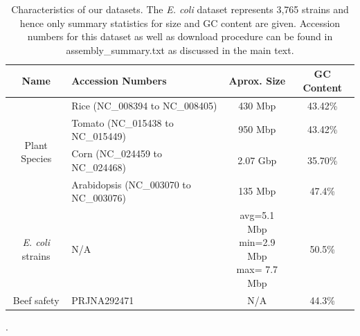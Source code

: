 \documentclass[doctor]{thesis}
\begin{document}
    \begin{table}
      \small
   \centering
   \begin{tabular}{|c|l|c|c|}
     \hline
     {\bf Name} &  {\bf Accession Numbers} & {\bf Aprox. Size} & {\bf GC Content} \\

     \hline
               	 	 	 	 	                
     \multirow{4}{*}{Plant Species }
     & Rice  (NC\_008394 to NC\_008405) & 430 Mbp & 43.42\% \\
     & Tomato  (NC\_015438 to NC\_015449) &  950 Mbp & 43.42\% \\
     & Corn  (NC\_024459 to NC\_024468) & 2.07 Gbp & 35.70\% \\
     & Arabidopsis  (NC\_003070 to NC\_003076) & 135 Mbp & 47.4\% \\
     \hline

     \emph{E. coli} strains &  N/A & \pbox{3cm}{avg=5.1 Mbp\\ min=2.9 Mbp\\ max= 7.7 Mbp} & 50.5\% \\

     \hline

     Beef safety &  PRJNA292471 & N/A & 44.3\% \\
     \hline
   \end{tabular}
       \caption{Characteristics of our datasets.  The \emph{E. coli} dataset represents 3,765 strains and hence only summary statistics for size and GC content are given. Accession numbers for this dataset as well as download procedure can be found in assembly\_summary.txt as discussed in the main text.}.
  \label{tbl-datasets}
   \end{table}
\end{document}
